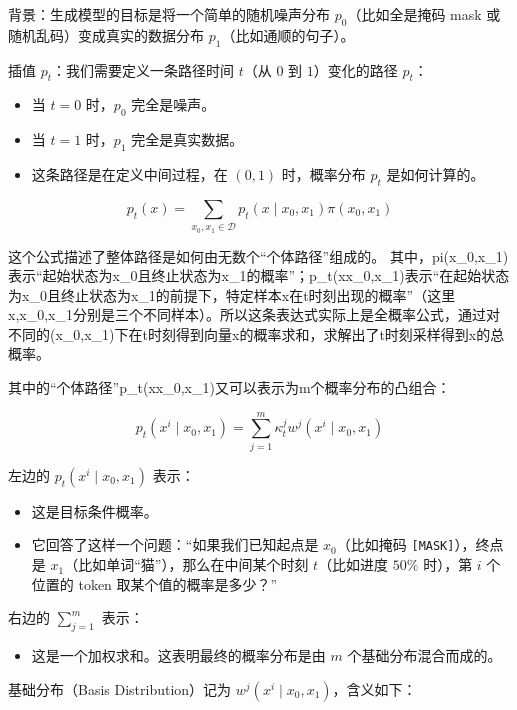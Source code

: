 背景：生成模型的目标是将一个简单的随机噪声分布 \(p_0\)（比如全是掩码 mask 或随机乱码）变成真实的数据分布 \(p_1\)（比如通顺的句子）。

插值 \(p_t\)：我们需要定义一条路径时间 \(t\)（从 \(0\) 到 \(1\)）变化的路径 \(p_t\)：

\begin{itemize}
\tightlist
\item
  当 \(t=0\) 时，\(p_0\) 完全是噪声。
\item
  当 \(t=1\) 时，\(p_1\) 完全是真实数据。
\item
  这条路径是在定义中间过程，在 \((0,1)\) 时，概率分布 \(p_t\) 是如何计算的。
\end{itemize}

\[
p_t(x)=\sum_{x_0,x_1\in\mathcal{D}}p_t(x\mid x_0,x_1)\pi(x_0,x_1)
\]

这个公式描述了整体路径是如何由无数个``个体路径''组成的。
其中，pi(x\_0,x\_1)表示``起始状态为x\_0且终止状态为x\_1的概率''；p\_t(x\textbar x\_0,x\_1)表示``在起始状态为x\_0且终止状态为x\_1的前提下，特定样本x在t时刻出现的概率''（这里x,x\_0,x\_1分别是三个不同样本）。所以这条表达式实际上是全概率公式，通过对不同的(x\_0,x\_1)下在t时刻得到向量x的概率求和，求解出了t时刻采样得到x的总概率。

其中的``个体路径''p\_t(x\textbar x\_0,x\_1)又可以表示为m个概率分布的凸组合：

\[
p_t(x^i\mid x_0,x_1)=\sum_{j=1}^m\kappa_t^j w^j(x^i\mid x_0,x_1)
\]

左边的 \(p_t(x^i\mid x_0,x_1)\) 表示：

\begin{itemize}
\tightlist
\item
  这是目标条件概率。
\item
  它回答了这样一个问题：``如果我们已知起点是 \(x_0\)（比如掩码 \texttt{{[}MASK{]}}），终点是 \(x_1\)（比如单词``猫''），那么在中间某个时刻 \(t\)（比如进度 \(50\%\) 时），第 \(i\) 个位置的 token 取某个值的概率是多少？''
\end{itemize}

右边的 \(\sum_{j=1}^m\) 表示：

\begin{itemize}
\tightlist
\item
  这是一个加权求和。这表明最终的概率分布是由 \(m\) 个基础分布混合而成的。
\end{itemize}

基础分布（Basis Distribution）记为 \(w^j(x^i\mid x_0,x_1)\)，含义如下：

